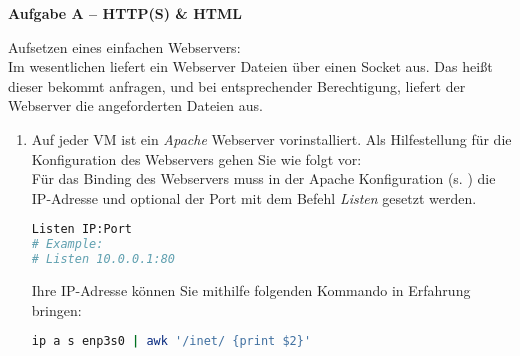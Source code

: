 \documentclass[paper=a4,fontsize=11pt]{scrartcl}%
\numberwithin{equation}{section}
\begin{document}
\begin{center}\Large{\textbf{Aufgabe A -- HTTP(S) \& HTML}}\end{center}\vskip0.25in
Aufsetzen eines einfachen Webservers:\\
Im wesentlichen liefert ein Webserver Dateien über einen Socket aus. Das heißt dieser bekommt anfragen, und bei entsprechender Berechtigung, liefert der Webserver die angeforderten Dateien aus.
\begin{enumerate}
	\item Auf jeder VM ist ein \emph{Apache} Webserver vorinstalliert. Als Hilfestellung für die Konfiguration des Webservers gehen Sie wie folgt vor:\\
	Für das Binding des Webservers muss in der Apache Konfiguration (s. ) die IP-Adresse und optional der Port mit dem Befehl \emph{Listen} gesetzt werden. 
	\begin{lstlisting}[style=Bash, language=Bash]
Listen IP:Port 
# Example: 
# Listen 10.0.0.1:80
\end{lstlisting}
Ihre IP-Adresse können Sie mithilfe folgenden Kommando in Erfahrung bringen:
\begin{lstlisting}[style=Bash, language=Bash]
ip a s enp3s0 | awk '/inet/ {print $2}'
\end{lstlisting}


\end{enumerate}
\end{document}
